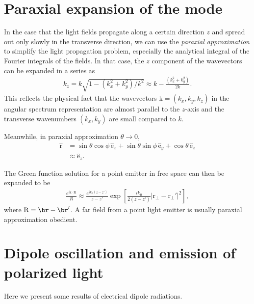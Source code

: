\documentclass[]{report}
\begin{document}
\section{Paraxial expansion of the mode}
In the case that the light fields propagate along a certain direction $ z $ and spread out only slowly in the transverse direction, we can use the \textit{paraxial approximation} to simplify the light propagation problem, especially the analytical integral of the Fourier integrals of the fields. In that case, the $ z $ component of the wavevectors can be expanded in a series as
\begin{align}
k_z=k\sqrt{1-(k^2_x+k^2_y)/k^2}\approx k-\frac{(k^2_x+k^2_y)}{2k}.
\end{align}
This reflects the physical fact that the wavevectors $ \mathrm{k}=(k_x,k_y,k_z) $ in the angular spectrum representation are almost parallel to the $ z $-axis and the transverse wavenumbers $ (k_x,k_y) $ are small compared to $ k $. 

Meanwhile, in paraxial approximation $ \theta\rightarrow 0 $,
\begin{align}
\hat{\mathrm{r}} &= \sin\theta\cos\phi \, \hat{\mathrm{e}}_x + \sin\theta \sin\phi\, \hat{\mathrm{e}}_y + \cos\theta \, \hat{\mathrm{e}}_z\\
&\approx \hat{\mathrm{e}}_z.
\end{align}

The Green function solution for a point emitter in free space can then be expanded to be
\begin{align}
\frac{e^{i\mathrm{k}\cdot \mathrm{R}}}{R}\approx \frac{e^{ik_0(z-z')}}{z-z'}\exp\left[ \frac{ik_0}{2(z-z')} \left| \mathrm{r}_\perp - \mathrm{r}_\perp'\right|^2 \right],
\end{align}
where $ \mathrm{R}=\br-\br' $. 
A far field from a point light emitter is usually paraxial approximation obedient. 







\section{Dipole oscillation and emission of polarized light}
Here we present some results of electrical dipole radiations.
\end{document}
